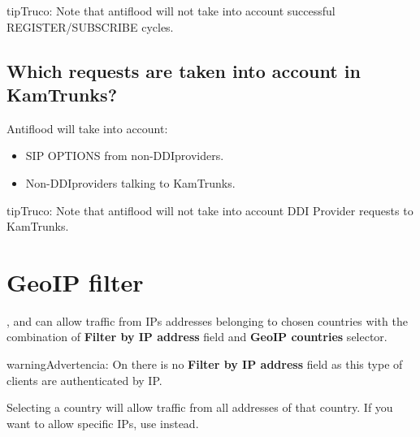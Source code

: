\documentclass[letterpaper,10pt,spanish]{sphinxmanual}
\begin{document}
\begin{notice}{tip}{Truco:}
Note that antiflood will not take into account successful REGISTER/SUBSCRIBE cycles.
\end{notice}


\subsection{Which requests are taken into account in KamTrunks?}
\label{security_and_maintenance/security/antiflooding:which-requests-are-taken-into-account-in-kamtrunks}
Antiflood will take into account:
\begin{itemize}
\item {} 
SIP OPTIONS from non-DDIproviders.

\item {} 
Non-DDIproviders talking to KamTrunks.

\end{itemize}

\begin{notice}{tip}{Truco:}
Note that antiflood will not take into account DDI Provider requests to KamTrunks.
\end{notice}


\section{GeoIP filter}
\label{security_and_maintenance/security/geoip_filter:geoip-filter}\label{security_and_maintenance/security/geoip_filter::doc}\label{security_and_maintenance/security/geoip_filter:id1}
,  and  can allow traffic from
IPs addresses belonging to chosen countries with the combination of \textbf{Filter by IP address} field and \textbf{GeoIP countries} selector.

\begin{notice}{warning}{Advertencia:}
On  there is no \textbf{Filter by IP address} field as this type of clients are authenticated by IP.
\end{notice}

Selecting a country will allow traffic from all addresses of that country. If you want to allow specific IPs, use
{\hyperref[security_and_maintenance/security/authorized_ip_ranges:client\string-authorized\string-ip\string-ranges]{}} instead.
\end{document}
